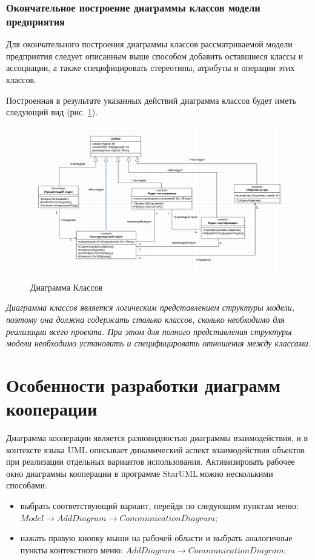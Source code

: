 \documentclass[a4paper,12pt]{report}
\newcommand{\staruml}{StarUML\,\tm}
\begin{document}
\subsubsection*{Окончательное построение диаграммы классов модели предприятия}
Для окончательного построения диаграммы классов рассматриваемой модели предприятия следует описанным выше способом добавить оставшиеся классы и ассоциации, а также специфицировать стереотипы, атрибуты и операции этих классов. 

Построенная в результате указанных действий диаграмма классов будет иметь следующий вид (рис. \ref{fig:classdiagram}).

\begin{figure}[h!]
	\centering
	\includegraphics[width=0.9\linewidth]{images/classdiagram}
	\caption{Диаграмма Классов}
	\label{fig:classdiagram}
\end{figure}


\textit{Диаграмма классов является логическим представлением структуры модели, поэтому она должна содержать столько классов, сколько необходимо для реализации всего проекта. При этом для полного представления структуры модели необходимо установить и специфицировать отношения между классами.} 


\section{Особенности разработки диаграмм кооперации}
Диаграмма кооперации является разновидностью диаграммы взаимодействия, и в контексте языка UML описывает динамический аспект взаимодействия объектов при реализации отдельных вариантов использования. Активизировать рабочее окно диаграммы кооперации в программе \staruml можно несколькими способами:
\begin{itemize}
	\item выбрать соответствующий вариант, перейдя по следующим пунктам меню: \\$Model \to Add Diagram \to Communication Diagram$;
	\item нажать правую кнопку мыши на рабочей области и выбрать аналогичные пункты контекстного меню: $Add Diagram \to Communication Diagram$;
\end{itemize}
\end{document}
